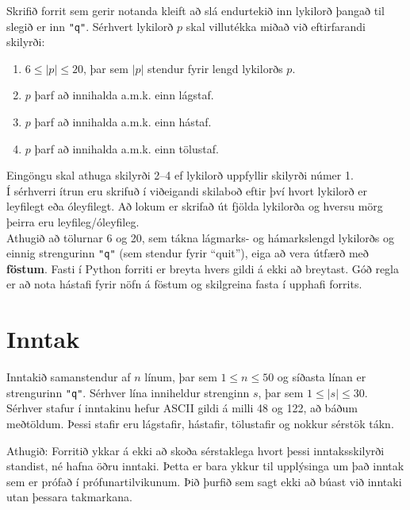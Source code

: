 
Skrifið forrit sem gerir notanda kleift að slá endurtekið inn lykilorð þangað til slegið er inn \texttt{"q"}.
Sérhvert lykilorð $p$ skal villutékka miðað við eftirfarandi skilyrði: 
\begin{enumerate} 
    \item $6 \le |p| \le 20$, þar sem $|p|$ stendur fyrir lengd lykilorðs $p$.
    \item $p$ þarf að innihalda a.m.k. einn lágstaf.
    \item $p$ þarf að innihalda a.m.k. einn hástaf.
    \item $p$ þarf að innihalda a.m.k. einn tölustaf.
\end{enumerate}

Eingöngu skal athuga skilyrði 2--4 ef lykilorð uppfyllir skilyrði númer 1. \\

Í sérhverri ítrun eru skrifuð í viðeigandi skilaboð eftir því hvort lykilorð er leyfilegt eða óleyfilegt.
Að lokum er skrifað út fjölda lykilorða og hversu mörg þeirra eru leyfileg/óleyfileg. \\

Athugið að tölurnar 6 og 20, sem tákna lágmarks- og hámarkslengd lykilorðs og einnig strengurinn \texttt{"q"} (sem stendur fyrir ``quit''), eiga að vera útfærð með \textbf{föstum}.
Fasti í Python forriti er breyta hvers gildi á ekki að breytast.
Góð regla er að nota hástafi fyrir nöfn á föstum og skilgreina fasta í upphafi forrits.  

\section*{Inntak}
Inntakið samanstendur af $n$ línum, þar sem $1 \le n \le 50$ og síðasta línan er strengurinn \texttt{"q"}.
Sérhver lína inniheldur strenginn $s$, þar sem $1 \le |s| \le 30$.
Sérhver stafur í inntakinu hefur ASCII gildi á milli 48 og 122, að báðum meðtöldum. 
Þessi stafir eru lágstafir, hástafir, tölustafir og nokkur sérstök tákn.

Athugið: Forritið ykkar á ekki að skoða sérstaklega hvort þessi inntaksskilyrði standist, né hafna öðru inntaki. 
Þetta er bara ykkur til upplýsinga um það inntak sem er prófað í prófunartilvikunum. 
Þið þurfið sem sagt ekki að búast við inntaki utan þessara takmarkana.

